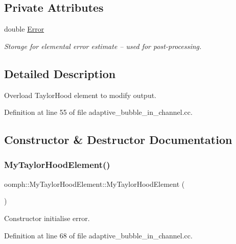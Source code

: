 \subsection*{Private Attributes}
\begin{DoxyCompactItemize}
\item 
double \hyperlink{classoomph_1_1MyTaylorHoodElement_a381cf2cdb628fb7aacfd6dd59dc2996b}{Error}
\begin{DoxyCompactList}\small\item\em Storage for elemental error estimate -- used for post-\/processing. \end{DoxyCompactList}\end{DoxyCompactItemize}


\subsection{Detailed Description}
Overload Taylor\+Hood element to modify output. 

Definition at line 55 of file adaptive\+\_\+bubble\+\_\+in\+\_\+channel.\+cc.



\subsection{Constructor \& Destructor Documentation}
\mbox{\label{classoomph_1_1MyTaylorHoodElement_a936bd6421ba42e5b73f983f5141b37c2}} 
\subsubsection{\texorpdfstring{My\+Taylor\+Hood\+Element()}{MyTaylorHoodElement()}}
{\footnotesize\ttfamily oomph\+::\+My\+Taylor\+Hood\+Element\+::\+My\+Taylor\+Hood\+Element (\begin{DoxyParamCaption}{ }\end{DoxyParamCaption})\hspace{0.3cm}{\ttfamily [inline]}}



Constructor initialise error. 



Definition at line 68 of file adaptive\+\_\+bubble\+\_\+in\+\_\+channel.\+cc.



